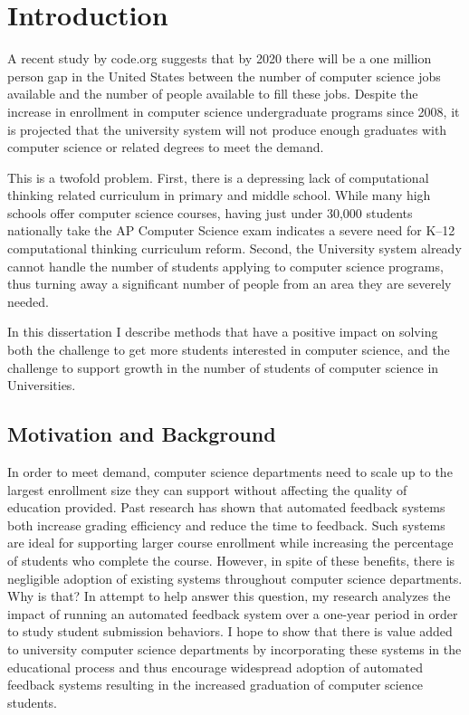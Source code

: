 \chapter{Introduction}
A recent study by code.org suggests that by 2020 there will be a one million
person gap in the United States between the number of computer science jobs
available and the number of people available to fill these jobs. Despite the
increase in enrollment in computer science undergraduate programs since 2008,
it is projected that the university system will not produce enough graduates
with computer science or related degrees to meet the demand.

This is a twofold problem. First, there is a depressing lack of computational
thinking related curriculum in primary and middle school. While many high
schools offer computer science courses, having just under 30,000 students
nationally take the AP Computer Science exam indicates a severe need for K--12
computational thinking curriculum reform. Second, the University system already
cannot handle the number of students applying to computer science programs,
thus turning away a significant number of people from an area they are severely
needed.

In this dissertation I describe methods that have a positive impact on solving
both the challenge to get more students interested in computer science, and the
challenge to support growth in the number of students of computer science in
Universities.

\section{Motivation and Background}
In order to meet demand, computer science departments need to scale up to the
largest enrollment size they can support without affecting the quality of
education provided. Past research has shown that automated feedback systems
both increase grading efficiency and reduce the time to feedback. Such systems
are ideal for supporting larger course enrollment while increasing the
percentage of students who complete the course. However, in spite of these
benefits, there is negligible adoption of existing systems throughout computer
science departments. Why is that? In attempt to help answer this question, my
research analyzes the impact of running an automated feedback system over a
one-year period in order to study student submission behaviors. I hope to show
that there is value added to university computer science departments by
incorporating these systems in the educational process and thus encourage
widespread adoption of automated feedback systems resulting in the increased
graduation of computer science students.

